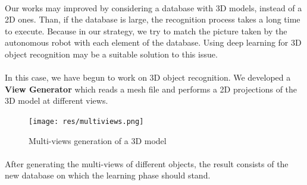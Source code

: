 \documentclass[12pt]{report}
\begin{document}
	\paragraph{}
	Our works may improved by considering a database with 3D models, instead of a 2D ones. Than, if the database is large, the recognition process takes a long time to execute. Because in our strategy, we try to match the picture taken by the autonomous robot with each element of the database. Using deep learning for 3D object recognition may be a suitable solution to this issue.
	
	\paragraph{}
	In this case, we have begun to work on 3D object recognition. We developed a \textbf{View Generator} which reads a mesh file and performs a 2D projections of the 3D model at different views.
	
	\begin{figure}[H]
		\begin{center}
			\texttt{[image: res/multiviews.png]}
			\caption{Multi-views generation of a 3D model}
		\end{center}
	\end{figure} 
\paragraph{}
After generating the multi-views of different objects, the result consists of the new database on which the learning phase should stand. 
\end{document}
